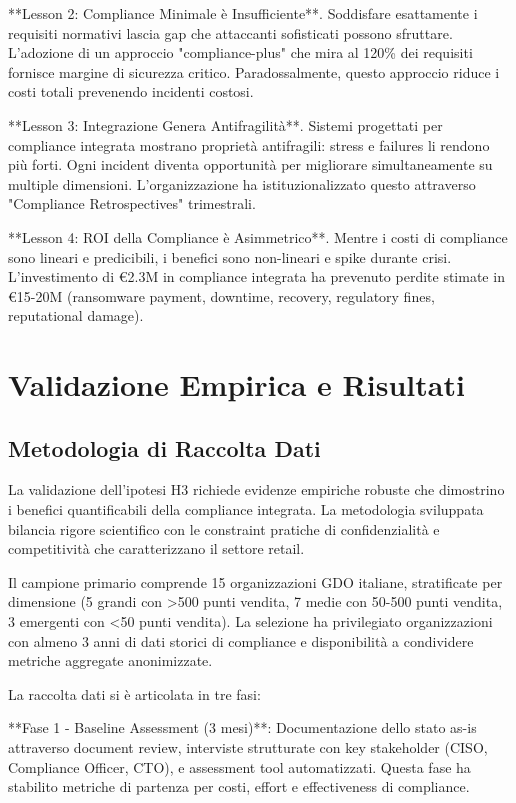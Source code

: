 **Lesson 2: Compliance Minimale è Insufficiente**. Soddisfare esattamente i requisiti normativi lascia gap che attaccanti sofisticati possono sfruttare. L'adozione di un approccio "compliance-plus" che mira al 120\% dei requisiti fornisce margine di sicurezza critico. Paradossalmente, questo approccio riduce i costi totali prevenendo incidenti costosi.

**Lesson 3: Integrazione Genera Antifragilità**. Sistemi progettati per compliance integrata mostrano proprietà antifragili: stress e failures li rendono più forti. Ogni incident diventa opportunità per migliorare simultaneamente su multiple dimensioni. L'organizzazione ha istituzionalizzato questo attraverso "Compliance Retrospectives" trimestrali.

**Lesson 4: ROI della Compliance è Asimmetrico**. Mentre i costi di compliance sono lineari e predicibili, i benefici sono non-lineari e spike durante crisi. L'investimento di €2.3M in compliance integrata ha prevenuto perdite stimate in €15-20M (ransomware payment, downtime, recovery, regulatory fines, reputational damage).

\section{Validazione Empirica e Risultati}

\subsection{Metodologia di Raccolta Dati}

La validazione dell'ipotesi H3 richiede evidenze empiriche robuste che dimostrino i benefici quantificabili della compliance integrata. La metodologia sviluppata bilancia rigore scientifico con le constraint pratiche di confidenzialità e competitività che caratterizzano il settore retail.

Il campione primario comprende 15 organizzazioni GDO italiane, stratificate per dimensione (5 grandi con >500 punti vendita, 7 medie con 50-500 punti vendita, 3 emergenti con <50 punti vendita). La selezione ha privilegiato organizzazioni con almeno 3 anni di dati storici di compliance e disponibilità a condividere metriche aggregate anonimizzate.

La raccolta dati si è articolata in tre fasi:

**Fase 1 - Baseline Assessment (3 mesi)**: Documentazione dello stato as-is attraverso document review, interviste strutturate con key stakeholder (CISO, Compliance Officer, CTO), e assessment tool automatizzati. Questa fase ha stabilito metriche di partenza per costi, effort e effectiveness di compliance.

